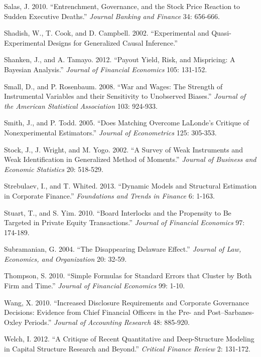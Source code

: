 \noindent Salas, J. 2010. ``Entrenchment, Governance, and the Stock Price Reaction to Sudden Executive Deaths.''  \textit{Journal Banking and Finance} 34: 656-666.

\noindent Shadish, W., T. Cook, and D. Campbell. 2002. ``Experimental and Quasi-Experimental Designs for Generalized Causal Inference.''

\noindent Shanken, J., and A. Tamayo. 2012. ``Payout Yield, Risk, and Mispricing:  A Bayesian Analysis.''  \textit{Journal of Financial Economics} 105: 131-152.

\noindent Small, D., and P. Rosenbaum. 2008. ``War and Wages:  The Strength of Instrumental Variables and their Sensitivity to Unobserved Biases.''  \textit{Journal of the American Statistical Association} 103: 924-933.

\noindent Smith, J., and P. Todd. 2005. ``Does Matching Overcome LaLonde's Critique of Nonexperimental Estimators.''  \textit{Journal of Econometrics} 125: 305-353.

\noindent Stock, J., J. Wright, and M. Yogo. 2002. ``A Survey of Weak Instruments and Weak Identification in Generalized Method of Moments.''  \textit{Journal of Business and Economic Statistics} 20: 518-529.

\noindent Strebulaev, I., and T. Whited. 2013. ``Dynamic Models and Structural Estimation in Corporate Finance.''  \textit{Foundations and Trends in Finance} 6: 1-163.

\noindent Stuart, T., and S. Yim. 2010. ``Board Interlocks and the Propensity to Be Targeted in Private Equity Transactions.''  \textit{Journal of Financial Economics} 97: 174-189.

\noindent Subramanian, G. 2004. ``The Disappearing Delaware Effect.''  \textit{Journal of Law, Economics, and Organization} 20: 32-59.

\noindent Thompson, S. 2010. ``Simple Formulas for Standard Errors that Cluster by Both Firm and Time.'' \textit{Journal of Financial Economics} 99: 1-10.

\noindent Wang, X. 2010. ``Increased Disclosure Requirements and Corporate Governance Decisions: Evidence from Chief Financial Officers in the Pre- and Post--Sarbanes-Oxley Periods.''  \textit{Journal of} \textit{Accounting Research} 48: 885-920.

\noindent Welch, I. 2012. ``A Critique of Recent Quantitative and Deep-Structure Modeling in Capital Structure Research and Beyond.''  \textit{Critical Finance Review} 2: 131-172. 

